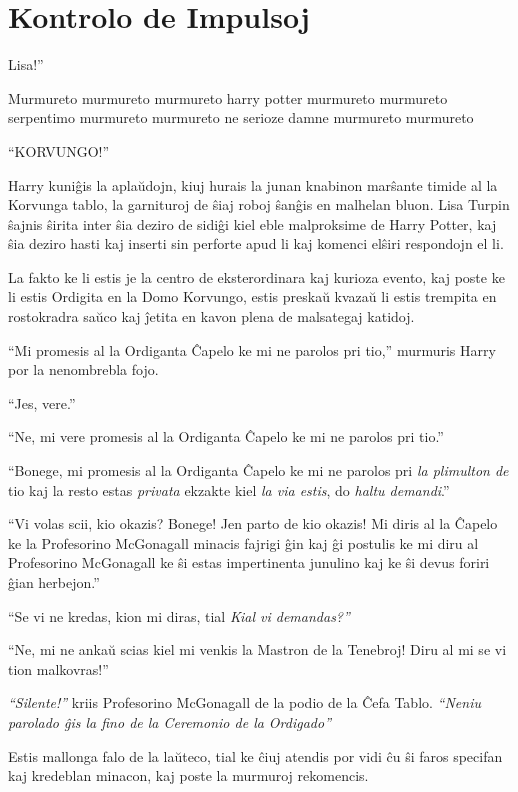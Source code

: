 \chapter{Kontrolo de Impulsoj}

 Lisa!”

\hplettrineextrapara
Murmureto murmureto murmureto harry potter murmureto murmureto
serpentimo murmureto murmureto ne serioze damne murmureto murmureto

``KORVUNGO!''

Harry kuniĝis la aplaŭdojn, kiuj hurais la junan knabinon marŝante
timide al la Korvunga tablo, la garnituroj de ŝiaj roboj ŝanĝis en
malhelan bluon. Lisa Turpin ŝajnis ŝirita inter ŝia deziro de sidiĝi
kiel eble malproksime de Harry Potter, kaj ŝia deziro hasti kaj
inserti sin perforte apud li kaj komenci elŝiri respondojn el li.

La fakto ke li estis je la centro de eksterordinara kaj kurioza
evento, kaj poste ke li estis Ordigita en la Domo Korvungo, estis
preskaŭ kvazaŭ li estis trempita en rostokradra saŭco kaj ĵetita en
kavon plena de malsategaj katidoj.

``Mi promesis al la Ordiganta Ĉapelo ke mi ne parolos pri tio,''
murmuris Harry por la nenombrebla fojo.

``Jes, vere.''

``Ne, mi vere promesis al la Ordiganta Ĉapelo ke mi ne parolos pri tio.''

``Bonege, mi promesis al la Ordiganta Ĉapelo ke mi ne parolos pri
\emph{la plimulton de} tio kaj la resto estas \emph{privata} ekzakte kiel
\emph{la via estis}, do \emph{haltu demandi}.''


``Vi volas scii, kio okazis? Bonege! Jen parto de kio okazis! Mi diris
al la Ĉapelo ke la Profesorino McGonagall minacis fajrigi ĝin kaj ĝi
postulis ke mi diru al Profesorino McGonagall ke ŝi estas
impertinenta junulino kaj ke ŝi devus foriri ĝian herbejon.''

``Se vi ne kredas, kion mi diras, tial \emph{Kial vi demandas?''}

``Ne, mi ne ankaŭ scias kiel mi venkis la Mastron de la Tenebroj! Diru
al mi se vi tion malkovras!''

\emph{``Silente!''} kriis Profesorino McGonagall de la podio de la
Ĉefa Tablo. \emph{``Neniu parolado ĝis la fino de la Ceremonio de la
Ordigado''}

Estis mallonga falo de la laŭteco, tial ke ĉiuj atendis por vidi ĉu ŝi
faros specifan kaj kredeblan minacon, kaj poste la murmuroj
rekomencis.

